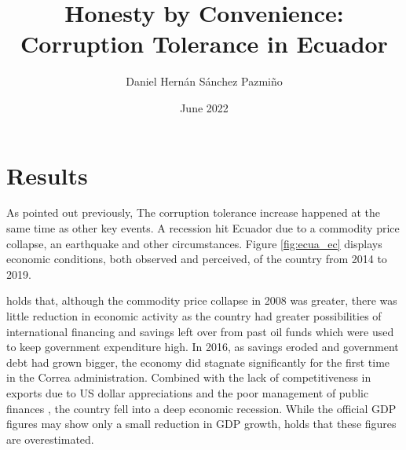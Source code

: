 \documentclass[12pt,a4]{article}
\title{Honesty by Convenience: Corruption Tolerance in Ecuador}
\author{Daniel Hernán Sánchez Pazmiño}
\date{June 2022}
\begin{document}


\section{Results}
\label{sec:findings}

As pointed out previously, The corruption tolerance increase happened at the same time as other key events. A recession hit Ecuador due to a commodity price collapse, an earthquake and other circumstances. Figure \ref{fig:ecua_ec} displays economic conditions, both observed and perceived, of the country from 2014 to 2019. 

\textcite{Orozco.2015} holds that, although the commodity price collapse in 2008 was greater, there was little reduction in economic activity as the country had greater possibilities of international financing and savings left over from past oil funds which were used to keep government expenditure high. In 2016, as savings eroded and government debt had grown bigger, the economy did stagnate significantly for the first time in the Correa administration. Combined with the lack of competitiveness in exports due to US dollar appreciations and the poor management of public finances \parencite{Hurtado.2018}, the country fell into a deep economic recession. While the official GDP figures may show only a small reduction in GDP growth, \textcite{Hurtado.2018} holds that these figures are overestimated.

\end{document}
